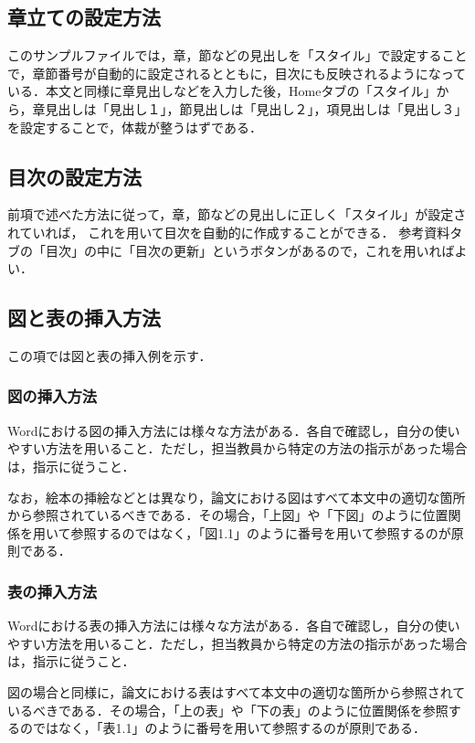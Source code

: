 \subsection{章立ての設定方法}
このサンプルファイルでは，章，節などの見出しを「スタイル」で設定することで，章節番号が自動的に設定されるとともに，目次にも反映されるようになっている．本文と同様に章見出しなどを入力した後，Homeタブの「スタイル」から，章見出しは「見出し１」，節見出しは「見出し２」，項見出しは「見出し３」を設定することで，体裁が整うはずである．

\subsection{目次の設定方法}
前項で述べた方法に従って，章，節などの見出しに正しく「スタイル」が設定されていれば，
これを用いて目次を自動的に作成することができる．
参考資料タブの「目次」の中に「目次の更新」というボタンがあるので，これを用いればよい．

\subsection{図と表の挿入方法}
この項では図と表の挿入例を示す．

\subsubsection{図の挿入方法}
Wordにおける図の挿入方法には様々な方法がある．各自で確認し，自分の使いやすい方法を用いること．ただし，担当教員から特定の方法の指示があった場合は，指示に従うこと．

なお，絵本の挿絵などとは異なり，論文における図はすべて本文中の適切な箇所から参照されているべきである．その場合，「上図」や「下図」のように位置関係を用いて参照するのではなく，「図1.1」のように番号を用いて参照するのが原則である．


\subsubsection{表の挿入方法}
Wordにおける表の挿入方法には様々な方法がある．各自で確認し，自分の使いやすい方法を用いること．ただし，担当教員から特定の方法の指示があった場合は，指示に従うこと．

図の場合と同様に，論文における表はすべて本文中の適切な箇所から参照されているべきである．その場合，「上の表」や「下の表」のように位置関係を参照するのではなく，「表1.1」のように番号を用いて参照するのが原則である．


